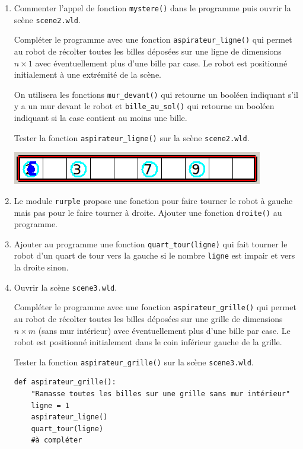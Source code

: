 \documentclass[a4paper, french, 12pt]{article}  %
\newcounter{prop}
\newcounter{def}
\newcounter{prog}
\begin{document}
\begin{enumerate}
\item Commenter l'appel de fonction \texttt{mystere()} dans le programme puis ouvrir la scène \texttt{scene2.wld}.

Compléter le programme avec une fonction  \texttt{aspirateur\_ligne()} qui permet au robot de récolter toutes les billes déposées sur une ligne  de dimensions $n \times 1$ avec éventuellement plus d'une bille par case. Le robot est positionné initialement à une extrémité de la scène.


On utilisera les fonctions \texttt{mur\_devant()} qui retourne un booléen indiquant s'il y a un mur devant le robot et \texttt{bille\_au\_sol()} qui retourne un booléen indiquant si la case contient au moins une bille.


Tester la fonction \texttt{aspirateur\_ligne()} sur la scène \texttt{scene2.wld}.


\begin{center}
 \includegraphics[scale=0.5]{images/rurplecuillettetantque2.png}
\end{center}


\item Le module \texttt{rurple} propose une fonction pour faire tourner le robot à gauche  mais pas pour le faire tourner à droite. Ajouter une fonction \texttt{droite()} au programme.

\item Ajouter au programme une fonction \texttt{quart\_tour(ligne)} qui fait tourner le robot d'un quart de tour vers la gauche si le nombre \texttt{ligne} est impair et vers la droite sinon.

\item Ouvrir la scène \texttt{scene3.wld}. 

Compléter le programme avec une fonction  \texttt{aspirateur\_grille()} qui permet au robot de récolter toutes les billes déposées sur une grille de dimensions $n \times m$ (sans mur intérieur) avec éventuellement plus d'une bille par case. Le robot est positionné initialement dans le coin inférieur gauche de la grille.

Tester la fonction \texttt{aspirateur\_grille()} sur la scène \texttt{scene3.wld}.


\begin{lstlisting}[style=rond]
def aspirateur_grille():
    "Ramasse toutes les billes sur une grille sans mur intérieur"
    ligne = 1
    aspirateur_ligne()
    quart_tour(ligne)
    #à compléter
\end{lstlisting}


\end{enumerate}
\end{document}
